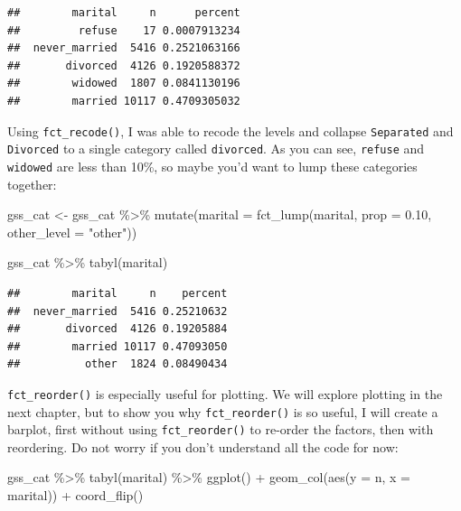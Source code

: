 \documentclass[
]{article}
\newenvironment{Shaded}{\begin{snugshade}}{\end{snugshade}}
\newcommand{\AttributeTok}[1]{\textcolor[rgb]{0.77,0.63,0.00}{#1}}
\newcommand{\FloatTok}[1]{\textcolor[rgb]{0.00,0.00,0.81}{#1}}
\newcommand{\FunctionTok}[1]{\textcolor[rgb]{0.00,0.00,0.00}{#1}}
\newcommand{\NormalTok}[1]{#1}
\newcommand{\OtherTok}[1]{\textcolor[rgb]{0.56,0.35,0.01}{#1}}
\newcommand{\SpecialCharTok}[1]{\textcolor[rgb]{0.00,0.00,0.00}{#1}}
\newcommand{\StringTok}[1]{\textcolor[rgb]{0.31,0.60,0.02}{#1}}
\begin{document}
\begin{verbatim}
##        marital     n      percent
##         refuse    17 0.0007913234
##  never_married  5416 0.2521063166
##       divorced  4126 0.1920588372
##        widowed  1807 0.0841130196
##        married 10117 0.4709305032
\end{verbatim}

Using \texttt{fct\_recode()}, I was able to recode the levels and collapse \texttt{Separated} and \texttt{Divorced} to
a single category called \texttt{divorced}. As you can see, \texttt{refuse} and \texttt{widowed} are less than 10\%, so
maybe you'd want to lump these categories together:

\begin{Shaded}
\begin{Highlighting}[]
\NormalTok{gss\_cat }\OtherTok{\textless{}{-}}\NormalTok{ gss\_cat }\SpecialCharTok{\%\textgreater{}\%}
  \FunctionTok{mutate}\NormalTok{(}\AttributeTok{marital =} \FunctionTok{fct\_lump}\NormalTok{(marital, }\AttributeTok{prop =} \FloatTok{0.10}\NormalTok{, }\AttributeTok{other\_level =} \StringTok{"other"}\NormalTok{))}

\NormalTok{gss\_cat }\SpecialCharTok{\%\textgreater{}\%}
  \FunctionTok{tabyl}\NormalTok{(marital)}
\end{Highlighting}
\end{Shaded}

\begin{verbatim}
##        marital     n    percent
##  never_married  5416 0.25210632
##       divorced  4126 0.19205884
##        married 10117 0.47093050
##          other  1824 0.08490434
\end{verbatim}

\texttt{fct\_reorder()} is especially useful for plotting. We will explore plotting in the next chapter,
but to show you why \texttt{fct\_reorder()} is so useful, I will create a barplot, first without
using \texttt{fct\_reorder()} to re-order the factors, then with reordering. Do not worry if you don't
understand all the code for now:

\begin{Shaded}
\begin{Highlighting}[]
\NormalTok{gss\_cat }\SpecialCharTok{\%\textgreater{}\%}
    \FunctionTok{tabyl}\NormalTok{(marital) }\SpecialCharTok{\%\textgreater{}\%}
    \FunctionTok{ggplot}\NormalTok{() }\SpecialCharTok{+}
    \FunctionTok{geom\_col}\NormalTok{(}\FunctionTok{aes}\NormalTok{(}\AttributeTok{y =}\NormalTok{ n, }\AttributeTok{x =}\NormalTok{ marital)) }\SpecialCharTok{+}
    \FunctionTok{coord\_flip}\NormalTok{()}
\end{Highlighting}
\end{Shaded}
\end{document}
